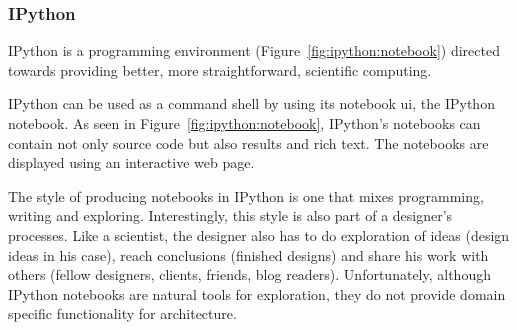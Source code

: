 

\subsubsection{IPython}
\label{section:ipython:related}
IPython\cite{PER-GRA:2007} is a programming environment (Figure~\ref{fig:ipython:notebook}) directed towards providing better, more straightforward, scientific computing.

IPython can be used as a command shell by using its notebook \gls{ui}, the IPython notebook.
As seen in Figure~\ref{fig:ipython:notebook}, IPython's notebooks can contain not only source code but also results and rich text.
The notebooks are displayed using an interactive web page.

The style of producing notebooks in IPython is one that mixes programming, writing and exploring.
Interestingly, this style is also part of a designer's processes.
Like a scientist, the designer also has to do exploration of ideas (design ideas in his case), reach conclusions (finished designs) and share his work with others (fellow designers, clients, friends, blog readers).
Unfortunately, although IPython notebooks are natural tools for exploration, they do not provide domain specific functionality for architecture.


